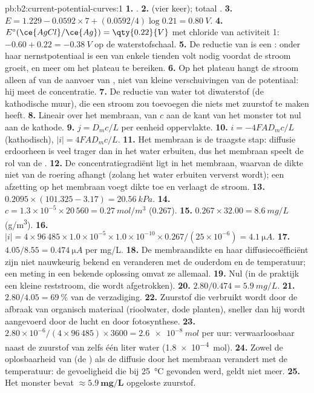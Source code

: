\begin{solution}{pb:b2:current-potential-curves:1}
\textbf{1.} .
\textbf{2.}  (vier keer); totaal .
\textbf{3.} $E = 1.229 - 0.0592 \times 7 + (0.0592/4)\log 0.21 = \qty{0.80}{V}$.
\textbf{4.} $E^\circ(\ce{AgCl}/\ce{Ag}) = \qty{0.22}{V}$ met chloride van activiteit 1:
$-0.60 + 0.22 = \qty{-0.38}{V}$ op de waterstofschaal.
\textbf{5.} De reductie van  is een : onder haar nernstpotentiaal
is een  van enkele tienden volt nodig voordat de stroom
groeit, en meer om het plateau te bereiken.
\textbf{6.} Op het plateau hangt de stroom alleen af van de aanvoer van ,
niet van kleine verschuivingen van de potentiaal: hij meet de concentratie.
\textbf{7.} De reductie van water tot diwaterstof (de kathodische muur), die
een stroom zou toevoegen die niets met zuurstof te maken heeft.
\textbf{8.} Lineair over het membraan, van $c$ aan de kant van het monster tot nul aan
de kathode.
\textbf{9.} $j = D_m c/L$ per eenheid oppervlakte.
\textbf{10.} $i = -4FAD_m c/L$ (kathodisch), $|i| = 4FAD_mc/L$.
\textbf{11.} Het membraan is de traagste stap: diffusie erdoorheen is veel
trager dan in het water erbuiten, dus het membraan speelt de rol van de
.
\textbf{12.} De concentratiegradiënt ligt in het membraan, waarvan de dikte
niet van de roering afhangt (zolang het water erbuiten ververst wordt);
een afzetting op het membraan voegt dikte toe en verlaagt de stroom.
\textbf{13.} $0.2095 \times (101.325 - 3.17) = \qty{20.56}{kPa}$.
\textbf{14.} $c = 1.3 \times 10^{-5} \times 20\,560 = \qty{0.27}{mol/m^3}$ ($0.267$).
\textbf{15.} $0.267 \times 32.00 = \qty{8.6}{mg/L}$ (\unit{g/m^3}).
\textbf{16.} $|i| = 4 \times 96\,485 \times 1.0 \times 10^{-5} \times 1.0 \times 10^{-10}
\times 0.267/(25 \times 10^{-6}) = \qty{4.1}{\micro A}$.
\textbf{17.} $4.05/8.55 = \qty{0.474}{\micro A}$ per \unit{mg/L}.
\textbf{18.} De membraandikte en haar diffusiecoëfficiënt zijn niet nauwkeurig
bekend en veranderen met de ouderdom en de temperatuur; een meting in een bekende
oplossing omvat ze allemaal.
\textbf{19.} Nul (in de praktijk een kleine reststroom, die wordt afgetrokken).
\textbf{20.} $2.80/0.474 = \qty{5.9}{mg/L}$.
\textbf{21.} $2.80/4.05 = 69~\%$ van de verzadiging.
\textbf{22.} Zuurstof die verbruikt wordt door de afbraak van organisch materiaal (rioolwater, dode planten),
sneller dan hij wordt aangevoerd door de lucht en door fotosynthese.
\textbf{23.} $2.80 \times 10^{-6}/(4 \times 96\,485) \times 3600 = \qty{2.6e-8}{mol}$
per uur: verwaarloosbaar naast de zuurstof van zelfs één liter water
(\qty{1.8e-4}{mol}).
\textbf{24.} Zowel de oplosbaarheid van  (de ) als de diffusie
door het membraan verandert met de temperatuur: de gevoeligheid die bij
\qty{25}{\degreeCelsius} gevonden werd, geldt niet meer.
\textbf{25.} Het monster bevat $\boldsymbol{\approx \qty{5.9}{mg/L}}$ opgeloste
zuurstof.
\end{solution}
